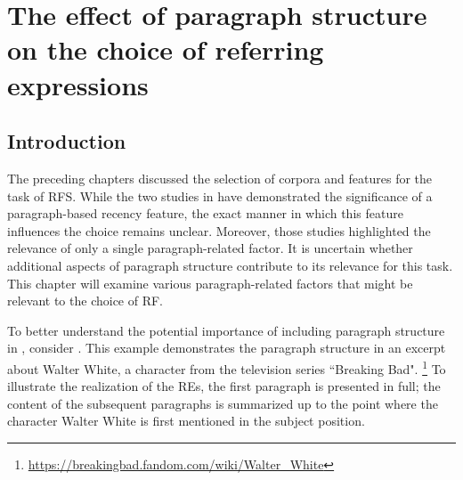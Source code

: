 \chapter{The effect of paragraph structure on the choice of referring expressions}\label{chap6}

\section{Introduction}

The preceding chapters discussed the selection of corpora and features for the task of RFS. While the two studies in  have demonstrated the significance of a paragraph-based recency feature, the exact manner in which this feature influences the choice remains unclear. Moreover, those studies highlighted the relevance of only a single paragraph-related factor. It is uncertain whether additional aspects of paragraph structure contribute to its relevance for this task. This chapter will examine various paragraph-related factors that might be relevant to the choice of RF.

To better understand the potential importance of including paragraph structure in \context, consider . This example demonstrates the paragraph structure in an excerpt about Walter White, a character from the television series ``Breaking Bad". \footnote{\url{https://breakingbad.fandom.com/wiki/Walter_White}} To illustrate the realization of the REs, the first paragraph is presented in full; the content of the subsequent paragraphs is summarized up to the point where the character Walter White is first mentioned in the subject position.

